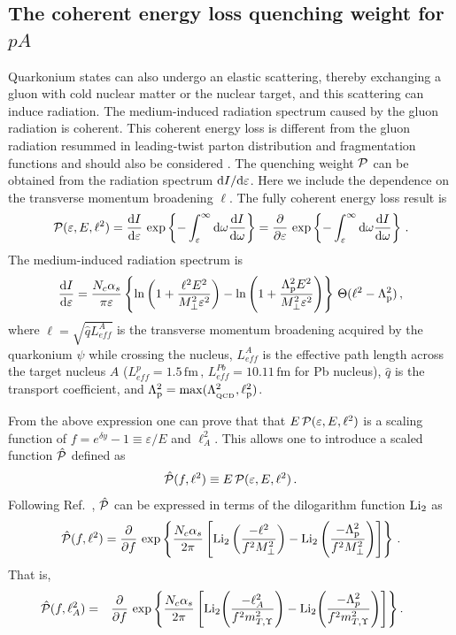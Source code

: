 \documentclass[11pt,onecolumn]{article}
\newcommand{\dd}{{\rm d}}
\newcommand{\beq}{\begin{equation}}
\newcommand{\eeq}{\end{equation}}
\newcommand{\bqa}{\begin{eqnarray}}
\newcommand{\eqa}{\end{eqnarray}}
\begin{document}
\subsection{The coherent energy loss quenching weight for $pA$}
%
Quarkonium states can also undergo an elastic scattering, thereby exchanging a gluon with cold nuclear matter
or the nuclear target, and this scattering can induce radiation. The medium-induced radiation spectrum caused
by the gluon radiation is coherent. This coherent energy loss is different from the gluon radiation resummed in leading-twist parton distribution and fragmentation functions and should also be considered \cite{Arleo:2012rs, Liou:2014rha}.
The quenching weight ${\cal P}$ can be obtained from the radiation spectrum ${\dd I}/{\dd \varepsilon}$.  Here we include the dependence on the transverse momentum broadening $\ell$.  The fully coherent energy loss result is~\cite{Arleo:2012rs}
%
\beq
\label{relation-P-spec}
{\cal P}(\varepsilon, E, \ell^2) = \frac{\dd I}{\dd\varepsilon} \, \exp \left\{ - \int_{\varepsilon}^{\infty} \dd\omega  \frac{\dd{I}}{\dd\omega} \right\} = \frac{\partial}{\partial \varepsilon} \, \exp \left\{ - \int_{\varepsilon}^{\infty} \dd\omega  \frac{\dd{I}}{\dd\omega} \right\} \, .
\eeq
%
The medium-induced radiation spectrum is
%
\beq
\label{eq:spectrum-def}
\frac{\dd I}{\dd \varepsilon} = \frac{N_c \alpha_s}{\pi \varepsilon} \left\{ \ln{\left(1+\frac{\ell^2 E^2}{M_\perp^2 \varepsilon^2}\right)} - \ln{\left(1+\frac{\Lambda_{\rm p}^2 E^2}{M_\perp^2 \varepsilon^2}\right)} \right\} \, \Theta(\ell^2 - \Lambda_{\rm p}^2) \, ,
\eeq
%
where $\ell = \sqrt{\hat{q} L^A_{eff}}$ is the transverse momentum broadening acquired by the quarkonium $\psi$ while crossing the nucleus, $L^A_{eff}$ is the effective path length across the target nucleus $A$ ($L^{p}_{eff} = 1.5 \, \text{fm} \, , \, L^{Pb}_{eff} = 10.11 \, \text{fm}$ for Pb nucleus), $\hat{q}$ is the transport coefficient,  and $\Lambda_{\mathrm p}^2 = {\rm max}(\Lambda_{_\mathrm{QCD}}^2,\ell_{\rm p}^2)$. 

From the above expression one can prove that that $E\,{\cal P}(\varepsilon,E,\ell^2)$ is a scaling function of $f = e^{\delta y} - 1 \equiv \varepsilon/E$ and $\ell_A^2$.  This allows one to introduce a scaled function $\hat{\cal P}$ defined as
%
\beq
\label{Phat-def}
\hat{\cal P}(f,\ell^2) \equiv E\,{\cal P}(\varepsilon,E,\ell^2) \, .
\eeq
%
Following Ref.~\cite{Arleo:2013zua}, $\hat{\cal P}$ can be expressed in terms of the dilogarithm function ${\rm Li}_2$ as
%
\beq
\hat{\cal P}(f,\ell^2) =  \frac{\partial}{\partial f} \, \exp \left\{\frac{N_c \alpha_s}{2 \pi} \left[ {\rm Li}_2\left(\frac{-\ell^2}{f^2 M_\perp^2} \right) - {\rm Li}_2\left(\frac{-\Lambda_{\rm p}^2}{f^2 M_\perp^2} \right) \right] \right\} \, .
\label{eq:quenching-dilog}
\eeq 
%
That is,
%
\bqa
\hat{\cal P}(f,\ell_A^2) &=&  \frac{\partial}{\partial f} \, \exp \left\{\frac{N_c \alpha_s}{2 \pi} \left[ {\rm Li}_2\!\left(\frac{-\ell_A^2}{f^2 m_{T,\Upsilon}^2} \right) - {\rm Li}_2\!\left(\frac{-\Lambda_{p}^2}{f^2 m_{T,\Upsilon}^2} \right) \right] \right\} . \;\;\;\;\;
\label{eq:quenching-dilog1}
\eqa
%
\end{document}
